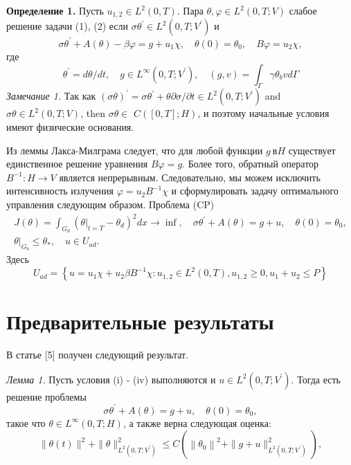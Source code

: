 \documentclass[10pt]{article}
\begin{document}
    \textbf{Определение 1.} Пусть $u_{1,2} \in L^{2}(0, T)$.
    Пара $\theta, \varphi \in L^{2}(0, T ; V)$ слабое решение задачи (1), (2) если
    $\sigma \theta^{\prime} \in L^{2}\left(0, T ; V^{\prime}\right)$ и
    \[
        \sigma \theta^{\prime}+A(\theta)-\beta \varphi=g+u_{1} \chi, \quad \theta(0)=\theta_{0}, \quad B \varphi=u_{2} \chi,
    \]
    где
    \[
        \theta^{\prime}=d \theta / d t, \quad g \in L^{\infty}\left(0, T ; V^{\prime}\right),
        \quad(g, v)=\int_{\Gamma} \gamma \theta_{b} v d \Gamma
    \]
    \textit{Замечание 1.} Так как $(\sigma \theta)^{\prime}=\sigma \theta^{\prime}+\theta
    \partial \sigma / \partial t \in L^{2}\left(0, T ; V^{\prime}\right)$ and $\sigma
    \theta \in L^{2}(0, T ; V)$, then $\sigma \theta \in$ $C([0, T] ; H)$, и поэтому начальные условия имеют физические основания.

    Из леммы Лакса-Милграма следует, что для любой функции $g\ в H$ существует единственное
    решение уравнения $B\varphi= g$.
    Более того, обратный оператор $B ^{-1}: H \rightarrow V$ является непрерывным.
    Следовательно, мы можем исключить интенсивность излучения $\varphi=u_{2} B ^ {-1} \chi$
    и сформулировать задачу оптимального управления следующим образом.
    Проблема (CP)
    \[
        \begin{gathered}
            J(\theta)=\int_{G_{d}}\left(\left.\theta\right|_{t=T}-\theta_{d}\right)^{2} d x \rightarrow \inf ,
            \quad \sigma \theta^{\prime}+A(\theta)=g+u, \quad \theta(0)=\theta_{0}, \\
            \left.\theta\right|_{G_{b}} \leq \theta_{*}, \quad u \in U_{a d}.
        \end{gathered}
    \]
    Здесь
    \[
        U_{a d}=\left\{u=u_{1} \chi+u_{2} \beta B^{-1} \chi: u_{1,2} \in L^{2}(0, T), u_{1,2}
        \geq 0, u_{1}+u_{2} \leq P\right\}
    \]


    \section{Предварительные результаты}
    В статье [5] получен следующий результат.

    \textit{Лемма 1.}
    Пусть условия (i) - (iv) выполняются и $u \in L^{2}\left(0, T ; V^{\prime}\right)$.
    Тогда есть решение проблемы
    \[
        \sigma \theta^{\prime}+A(\theta)=g+u, \quad \theta(0)=\theta_{0},
    \]
    такое что $\theta \in L^{\infty}(0, T ; H)$, а также верна следующая оценка:
    \[
        \|\theta(t)\|^{2}+\|\theta\|_{L^{2}\left(0, T ; V^{\prime}\right)}^{2} \leq C\left(\left\|\theta_{0}\right\|^{2}+\|g+u\|_{L^{2}\left(0, T ; V^{\prime}\right)}^{2}\right),
    \]
\end{document}
